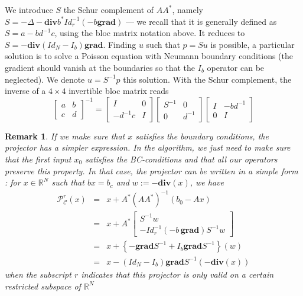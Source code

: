 \documentclass[13pt,aps,prb,preprint]{article}
\newtheorem{rem}{Remark}
\renewcommand{\div}{\mathbf{div}}
\newcommand{\grad}{\mathbf{grad}}
\newcommand{\R}{\mathbb{R}}
\begin{document}
We introduce $S$ the Schur complement of $AA^*$, namely $S=-\Delta -\div b^* Id_r^{-1}(-b \grad)$ --- we recall that it is generally defined as $S= a-bd^{-1}c$, using the bloc matrix notation above. It reduces to $S = - \div (Id_N - I_b)  \grad $. Finding $u$ such that $p=Su$  is possible, a particular solution is to solve a Poisson equation with Neumann boundary conditions (the gradient should vanish at the boundaries so that the $I_b$ operator can be neglected). We denote $u=S^{-1} p$ this solution. With the Schur complement, the inverse of a $4\times4$ invertible bloc matrix reads
\begin{equation}
\left[
\begin{array}{c|c}
a & b\\ \hline
c & d
\end{array} \right]^{-1}=
\left[
\begin{array}{c|c}
I & 0\\ \hline
-d^{-1}c & I
\end{array} \right]
\left[
\begin{array}{c|c}
S^{-1} & 0\\ \hline
0 & d^{-1}
\end{array} \right]
\left[
\begin{array}{c|c}
I & -bd^{-1}\\ \hline
0 & I
\end{array} \right]
\end{equation}

\begin{rem} If we make sure that  $x$ satisfies the boundary conditions, the projector has a simpler expression. In the algorithm, we just need to make sure that the first input $x_0$ satisfies the BC-conditions and that all our operators preserve this property. In that case, the projector can be written in a simple form : for $x\in \R^N$ such that $bx=b_c$ and $w:= -\div (x)$, we have
\begin{eqnarray}
\mathcal{P}_\mathcal{C}^r (x) & = & x + A^* (A A^*)^{-1}(b_0 -Ax) \\
& = & x + A^* \left[
\begin{array}{c}
S^{-1} w \\ \hline
-Id_r^{-1} (-b\, \grad ) S^{-1}w
\end{array} \right] \\
& = & x + \left\{ -\grad S^{-1}+ I_b \grad S^{-1} \right\} (w) \\
& = & x - (Id_N-I_b) \grad S^{-1} (-\div (x) )
\end{eqnarray}
when the subscript $r$ indicates that this projector is only valid on a certain restricted subspace of $\R^N$
\end{rem}
\end{document}
